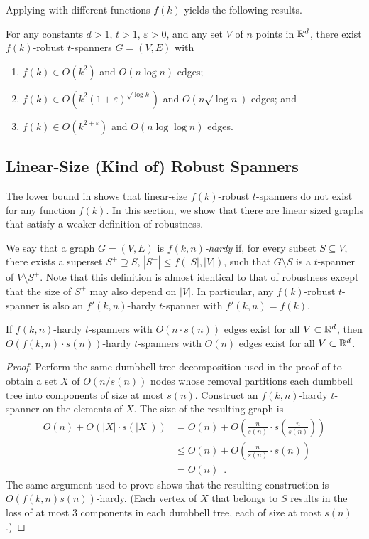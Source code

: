 \documentclass{patmorin}
\newcommand{\eps}{\varepsilon}
\begin{document}
Applying  with different functions $f(k)$ yields the
following results.
\begin{cor}
  For any constants $d >1$, $t>1$, $\eps>0$, and any set $V$ of $n$ points
  in $\mathbb{R}^d$, there exist $f(k)$-robust $t$-spanners $G=(V,E)$ with
  \begin{enumerate}
    \item $f(k)\in O(k^2)$ and $O(n\log n)$ edges;
    \item $f(k)\in O(k^2(1+\eps)^{\sqrt{\log k}})$ and $O(n\sqrt{\log n})$
      edges; and
    \item $f(k)\in O(k^{2+\eps})$ and $O(n\log\log n)$ edges.
  \end{enumerate}
\end{cor}



\subsection{Linear-Size (Kind of) Robust Spanners}

The lower bound in  shows that linear-size
$f(k)$-robust $t$-spanners do not exist for any function $f(k)$.  In this
section, we show that there are linear sized graphs that satisfy a weaker
definition of robustness.

We say that a graph $G=(V,E)$ is \emph{$f(k,n)$-hardy} if, for every
subset $S\subseteq V$, there exists a superset $S^+\supseteq S$,
$|S^+|\le f(|S|,|V|)$, such that $G\setminus S$ is a $t$-spanner of
$V\setminus S^+$.  Note that this definition is almost identical to that
of robustness except that the size of $S^+$ may also depend on $|V|$.  In particular, any $f(k)$-robust $t$-spanner is also an $f'(k,n)$-hardy $t$-spanner with $f'(k,n)=f(k)$.

\begin{thm}
  If $f(k,n)$-hardy $t$-spanners with $O(n\cdot s(n))$ edges exist for
  all $V\subset\mathbb{R}^d$, then $O(f(k,n)\cdot s(n))$-hardy $t$-spanners with
  $O(n)$ edges exist for all $V\subset\mathbb{R}^d$.
\end{thm}

\begin{proof}
  Perform the same dumbbell tree decomposition used in the proof of
   to obtain a set $X$ of $O(n/s(n))$ nodes whose removal
  partitions each dumbbell tree into components of size at most $s(n)$.
  Construct an $f(k,n)$-hardy $t$-spanner on the elements of $X$.
  The size of the resulting graph is 
  \begin{align*}
    O(n) + O(|X|\cdot s(|X|)) 
       & = O(n) + O\left(\frac{n}{s(n)}\cdot s\left(\frac{n}{s(n)}\right)\right) \\
       & \le O(n) + O\left(\frac{n}{s(n)}\cdot s(n)\right) \\
       & = O(n) \enspace . 
  \end{align*}
  The same argument used to prove  shows that the resulting
  construction is $O(f(k,n)s(n))$-hardy.  (Each vertex of $X$ that
  belongs to $S$ results in the loss of at most 3 components in each
  dumbbell tree, each of size at most $s(n)$.)
\end{proof}
\end{document}
